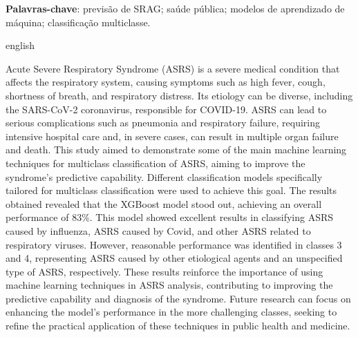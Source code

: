\documentclass[12pt,oneside,a4paper,chapter=TITLE,
			   english,brazil]{abntex2}
\begin{document}
\begin{resumo}
	\textbf{Palavras-chave}: previsão de SRAG; saúde pública;  modelos de aprendizado de máquina; classificação multiclasse.
\end{resumo}

\begin{resumo}[Abstract]
	\begin{otherlanguage*}{english}


Acute Severe Respiratory Syndrome (ASRS) is a severe medical condition that affects the respiratory system, causing symptoms such as high fever, cough, shortness of breath, and respiratory distress. Its etiology can be diverse, including the SARS-CoV-2 coronavirus, responsible for COVID-19. ASRS can lead to serious complications such as pneumonia and respiratory failure, requiring intensive hospital care and, in severe cases, can result in multiple organ failure and death. This study aimed to demonstrate some of the main machine learning techniques for multiclass classification of ASRS, aiming to improve the syndrome's predictive capability. Different classification models specifically tailored for multiclass classification were used to achieve this goal. The results obtained revealed that the XGBoost model stood out, achieving an overall performance of 83\%. This model showed excellent results in classifying ASRS caused by influenza, ASRS caused by Covid, and other ASRS related to respiratory viruses. However, reasonable performance was identified in classes 3 and 4, representing ASRS caused by other etiological agents and an unspecified type of ASRS, respectively. These results reinforce the importance of using machine learning techniques in ASRS analysis, contributing to improving the predictive capability and diagnosis of the syndrome. Future research can focus on enhancing the model's performance in the more challenging classes, seeking to refine the practical application of these techniques in public health and medicine.
		

\end{otherlanguage*}
\end{resumo}
\end{document}
